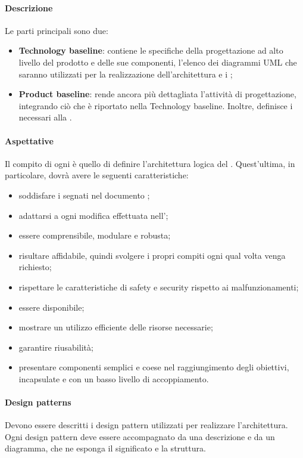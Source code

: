 \paragraph{Descrizione}
Le parti principali sono due:
\begin{itemize}
\item \textbf{Technology baseline}: contiene le specifiche della progettazione ad alto livello del prodotto e delle sue componenti, l'elenco dei diagrammi UML che saranno utilizzati per la realizzazione dell'architettura e i ;
\item \textbf{Product baseline}: rende ancora più dettagliata l'attività di progettazione, integrando ciò che è riportato nella Technology baseline. Inoltre, definisce i  necessari alla .
\end{itemize}
\paragraph{Aspettative}
Il compito di ogni \prog{} è quello di definire l'architettura logica del . Quest'ultima, in particolare, dovrà avere le seguenti caratteristiche:
\begin{itemize}
\item soddisfare i  segnati nel documento \AdR{};
\item adattarsi a ogni modifica effettuata nell'\AdR{};
\item essere comprensibile, modulare e robusta;
\item risultare affidabile, quindi svolgere i propri compiti ogni qual volta venga richiesto;
\item rispettare le caratteristiche di safety e security rispetto ai malfunzionamenti;
\item essere disponibile;
\item mostrare un utilizzo efficiente delle risorse necessarie;
\item garantire riusabilità;
\item presentare componenti semplici e coese nel raggiungimento degli obiettivi, incapsulate e con un basso livello di accoppiamento.
\end{itemize}
\paragraph{Design patterns}
Devono essere descritti i design pattern utilizzati per realizzare l'architettura. Ogni design pattern deve essere accompagnato da una descrizione e da un diagramma, che ne esponga il significato e la struttura.
